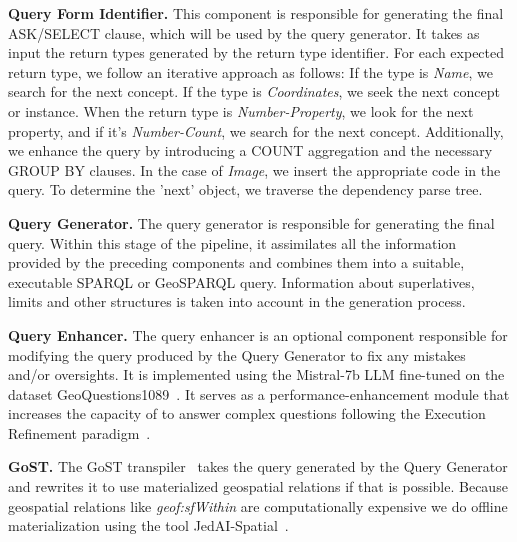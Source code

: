 \textbf{Query Form Identifier.} This component is responsible for generating the final ASK/SELECT clause, which will be used by the query generator. It takes as input the return types generated by the return type identifier. For each expected return type, we follow an iterative approach as follows: If the type is \textit{Name}, we search for the next concept. If the type is \textit{Coordinates}, we seek the next concept or instance. When the return type is \textit{Number-Property}, we look for the next property, and if it's \textit{Number-Count}, we search for the next concept. Additionally, we enhance the query by introducing a COUNT aggregation and the necessary GROUP BY clauses. In the case of \textit{Image}, we insert the appropriate code in the query. To determine the 'next' object, we traverse the dependency parse tree.

\textbf{Query Generator.} The query generator is responsible for generating the final query. Within this stage of the pipeline, it assimilates all the information provided by the preceding components and combines them into a suitable, executable SPARQL or GeoSPARQL query. Information about superlatives, limits and other structures is taken into account in the generation process.

\textbf{Query Enhancer.} The query enhancer is an optional component responsible for modifying the query produced by the Query Generator to fix any mistakes and/or oversights. It is implemented using the Mistral-7b LLM fine-tuned on the dataset GeoQuestions1089~\cite{geoquestions1089}. It serves as a performance-enhancement module that increases the capacity of \EngineName{} to answer complex questions following the Execution Refinement paradigm~\cite{neural-interfaces}.

\textbf{GoST.} The GoST transpiler~\cite{geoquestions1089} takes the query generated by the Query Generator and rewrites it to use materialized geospatial relations if that is possible. Because geospatial relations like \textit{geof:sfWithin} are computationally expensive we do offline materialization using the tool JedAI-Spatial~\cite{jedai-spatial}.